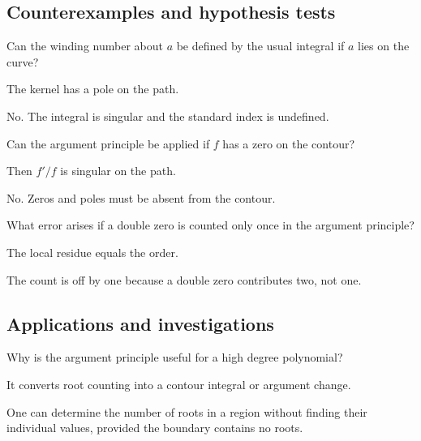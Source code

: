 \subsection*{Counterexamples and hypothesis tests}

\begin{exercise}\label{exr:iv12-expand-10}
Can the winding number about \(a\) be defined by the usual integral if \(a\) lies on the curve?
\end{exercise}
\begin{hint}
The kernel has a pole on the path.
\end{hint}
\begin{solution}
No. The integral is singular and the standard index is undefined.
\end{solution}

\begin{exercise}\label{exr:iv12-expand-11}
Can the argument principle be applied if \(f\) has a zero on the contour?
\end{exercise}
\begin{hint}
Then \(f'/f\) is singular on the path.
\end{hint}
\begin{solution}
No. Zeros and poles must be absent from the contour.
\end{solution}

\begin{exercise}\label{exr:iv12-expand-12}
What error arises if a double zero is counted only once in the argument principle?
\end{exercise}
\begin{hint}
The local residue equals the order.
\end{hint}
\begin{solution}
The count is off by one because a double zero contributes two, not one.
\end{solution}

\subsection*{Applications and investigations}

\begin{exercise}\label{exr:iv12-expand-13}
Why is the argument principle useful for a high degree polynomial?
\end{exercise}
\begin{hint}
It converts root counting into a contour integral or argument change.
\end{hint}
\begin{solution}
One can determine the number of roots in a region without finding their individual values, provided the boundary contains no roots.
\end{solution}


